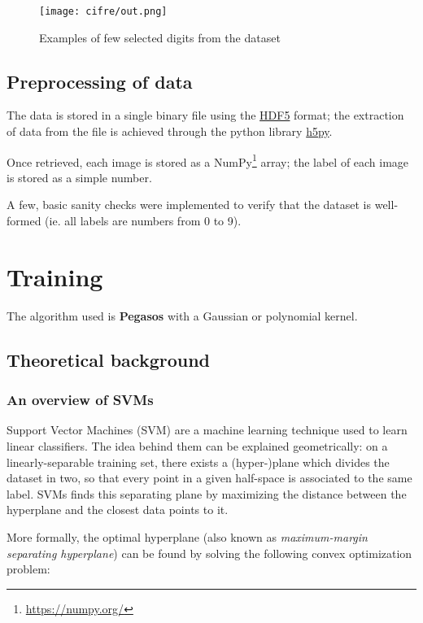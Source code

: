 \documentclass[a4paper]{article}
\begin{document}
\begin{figure}[htbp]
\centering
\texttt{[image: cifre/out.png]}
\caption[Short caption]{Examples of few selected digits from the dataset}
\end{figure}

\subsection{Preprocessing of data}
\label{sec:org59b2a47}

The data is stored in a single binary file using the \href{https://www.hdfgroup.org/solutions/hdf5/}{HDF5} format; the extraction of data from the file is achieved through the python library \href{https://www.h5py.org/}{h5py}.

Once retrieved, each image is stored as a NumPy\footnote{\url{https://numpy.org/}} \cite{harris2020array} array; the label of each image is stored as a simple number.

A few, basic sanity checks were implemented to verify that the dataset is well-formed (ie. all labels are numbers from 0 to 9). 

\section{Training}
\label{sec:org6d13279}

The algorithm used is \textbf{Pegasos} with a Gaussian or polynomial kernel.

\subsection{Theoretical background}
\label{sec:org48ab3f7}

\subsubsection{An overview of SVMs}
\label{sec:org704c6b4}
\label{org0c7ac3f}
Support Vector Machines (SVM)\cite{cortes1995support} are a machine learning technique used to learn linear classifiers. The idea behind them can be explained geometrically: on a linearly-separable training set, there exists a (hyper-)plane which divides the dataset in two, so that every point in a given half-space is associated to the same label. SVMs finds this separating plane by maximizing the distance between the hyperplane and the closest data points to it.

More formally, the optimal hyperplane (also known as \emph{maximum-margin separating hyperplane}) can be found by solving the following convex optimization problem:
\end{document}
